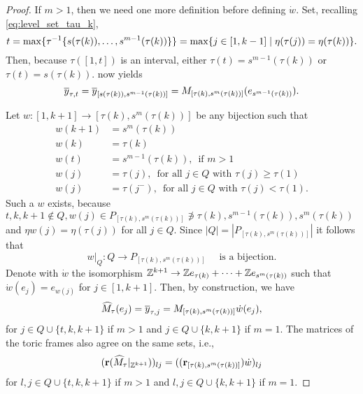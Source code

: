 \begin{proof}
	If $m > 1$, then we need one more definition before defining $\dot{w}$. Set, recalling
	\cref{eq:level_set_tau_k},
	\begin{equation*}
		t = \max\{\tau^{-1}\{s(\tau(k)), \dots, s^{m-1}(\tau(k))\}\} = \max \{j \in [1, k-1] \mid \eta(\tau(j)) = \eta(\tau(k))\}.
	\end{equation*}
	Then, because $\tau([1, t])$ is an interval, either $\tau(t) = s^{m-1}(\tau(k))$ or
	$\tau(t) = s(\tau(k))$.  now yields
	\begin{equation*}
		\overline{y}_{\tau, t} = \overline{y}_{[s(\tau(k)), s^{m-1}(\tau(k))]} = M_{[\tau(k), s^m(\tau(k))]}(e_{s^{m-1}(\tau(k))}).
	\end{equation*}

	Let $w \colon [1, k+1] \to [\tau(k), s^m(\tau(k))]$ be any bijection such that
	\begin{align*}
		w(k+1) & = s^m(\tau(k))                                                            \\
		w(k)   & = \tau(k)                                                                 \\
		w(t)   & = s^{m-1}(\tau(k)),\,\text{ if }m >1                                      \\
		w(j)   & = \tau(j), \,\text{ for all }j \in Q \text{ with } \tau(j) \geq \tau(1)   \\
		w(j)   & = \tau(j^{-}), \,\text{ for all }j \in Q \text{ with } \tau(j) < \tau(1).
	\end{align*}
	Such a $w$ exists, because $t,k,k+1 \notin Q, w(j) \in P_{[\tau(k), s^m(\tau(k))]}
		\not\ni \tau(k), s^{m-1}(\tau(k)), s^m(\tau(k))$ and $\eta w(j) = \eta(\tau(j))$ for
	all $j \in Q$. Since $|Q| = |P_{[\tau(k), s^m(\tau(k))]}|$ it follows that
	\begin{equation}\label{eq:w_is_bijection}
		w|_Q \colon Q \to P_{[\tau(k), s^m(\tau(k))]}\quad \text{ is a bijection.}
	\end{equation}
	Denote with $\dot{w}$ the isomorphism $\mathbb{Z}^{k+1} \to \mathbb{Z} e_{\tau(k)} + \cdots + \mathbb{Z}
		e_{s^m(\tau(k))}$ such that $\dot{w}(e_j) = e_{w(j)}$ for $j\in[1, k+1]$. Then, by
	construction, we have
	\begin{equation*}
		\widehat{M}_\tau(e_j) = \overline{y}_{\tau, j} = M_{[\tau(k), s^m(\tau(k))]}\dot{w}(e_j),
	\end{equation*}
	for $j\in Q \cup \{t, k, k+1\}$ if $m>1$ and $j \in Q \cup \{k, k+1\}$ if $m=1$. The
	matrices of the toric frames also agree on the same sets, i.e.,
	\begin{equation*}
		(\mathbf{r}(\widehat{M}_\tau |_{\mathbb{Z}^{k+1}}))_{lj} = ((\mathbf{r}_{[\tau(k), s^m(\tau(k))]})\dot{w})_{lj}
	\end{equation*}
	for $l,j \in Q \cup \{t, k, k+1\}$ if $m>1$ and $l, j \in Q \cup \{k, k+1\}$ if $m=1$.


\end{proof}
